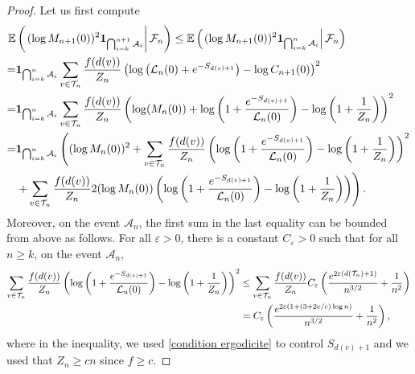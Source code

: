 \documentclass[11pt]{article}
\numberwithin{equation}{section}
\def\vp{\varepsilon}
\def \T{\mathcal{T}}
\def \cL{\mathcal{L}}
\def\E{\mathbb{E}}
\begin{document}
\begin{proof}
	Let us first compute
	\begin{align*}
		\E&\left( \left. (\log M_{n+1}(0))^2{\bf 1}_{\bigcap_{i=k}^{n+1} \mathcal{A}_i} \right\vert \mathcal{F}_n \right)
		\le \E\left( \left. (\log M_{n+1}(0))^2{\bf 1}_{\bigcap_{i=k}^{n} \mathcal{A}_i} \right\vert \mathcal{F}_n \right) \\
		=&{\bf 1}_{\bigcap_{i=k}^{n} \mathcal{A}_i}
		\sum_{v \in \T_n} \frac{f(d(v))}{Z_n} \left( \log\left(\cL_n(0)+ e^{-S_{d(v)+1}}\right) -\log C_{n+1}(0)\right)^2\\
		=&{\bf 1}_{\bigcap_{i=k}^{n} \mathcal{A}_i}\sum_{v \in \T_n} \frac{f(d(v))}{Z_n} \left(\log(M_n(0)) + \log \left(1+ \frac{e^{-S_{d(v)+1}} }{\cL_n(0)}\right) -\log\left(1+\frac{1}{Z_n}\right)\right)^2\\
		=&{\bf 1}_{\bigcap_{i=k}^{n} \mathcal{A}_i} \left( (\log M_n(0))^2 + \sum_{v \in \T_n} \frac{f(d(v))}{Z_n} \left(\log \left(1+ \frac{e^{-S_{d(v)+1}} }{\cL_n(0)}\right) -\log\left(1+\frac{1}{Z_n}\right)\right)^2 \right. \\
		&\left.+ \sum_{v \in \T_n} \frac{f(d(v))}{Z_n}2(\log M_n(0))\left(\log \left(1+ \frac{e^{-S_{d(v)+1}} }{\cL_n(0)}\right) -\log\left(1+\frac{1}{Z_n}\right)\right)  \right).
	\end{align*}
	Moreover, on the event $\mathcal{A}_n$, the first sum in the last equality can be bounded from above as follows. For all $\vp>0$, there is a constant $C_\vp>0$ such that for all $n\ge k$, on the event $\mathcal{A}_n$,
	\begin{align}
		\sum_{v \in \T_n} \frac{f(d(v))}{Z_n} \left(\log \left(1+ \frac{e^{-S_{d(v)+1}} }{\cL_n(0)}\right) -\log\left(1+\frac{1}{Z_n}\right)\right)^2&\le
		\sum_{v \in \T_n} \frac{f(d(v))}{Z_n}C_\vp \left( \frac{e^{2\vp (d(\T_n)+1)}}{n^{3/2}} + \frac{1}{n^2} \right) \notag \\
		&= C_\vp \left( \frac{e^{2\vp (1+(3+2e/c)\log n)}}{n^{3/2}} + \frac{1}{n^2} \right), \label{eq premiere somme}
	\end{align}
	where in the inequality, we used \eqref{condition ergodicite} to control $S_{d(v)+1}$ and we used that $Z_n \ge cn$ since $f\ge c$.
	

\end{proof}
\end{document}
